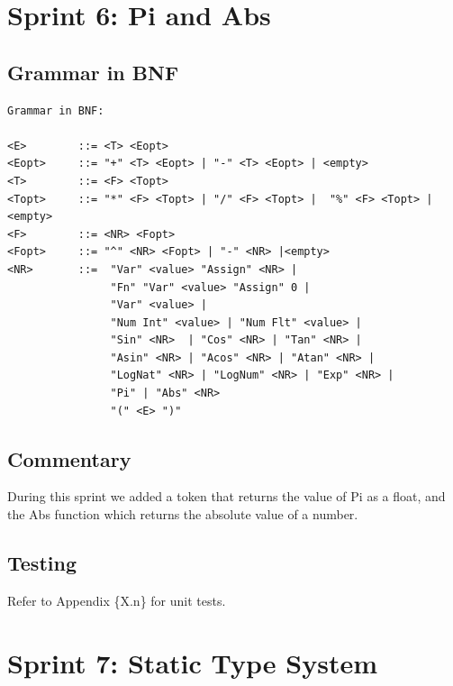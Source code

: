 \documentclass[a4paper, oneside, 11pt]{report}
\begin{document}
    \section{Sprint 6: Pi and Abs}
    \subsection{Grammar in BNF}
    \begin{verbatim}
Grammar in BNF:

<E>        ::= <T> <Eopt>
<Eopt>     ::= "+" <T> <Eopt> | "-" <T> <Eopt> | <empty>
<T>        ::= <F> <Topt>
<Topt>     ::= "*" <F> <Topt> | "/" <F> <Topt> |  "%" <F> <Topt> |<empty>
<F>        ::= <NR> <Fopt>
<Fopt>     ::= "^" <NR> <Fopt> | "-" <NR> |<empty>
<NR>       ::=  "Var" <value> "Assign" <NR> |
                "Fn" "Var" <value> "Assign" 0 |
                "Var" <value> |
                "Num Int" <value> | "Num Flt" <value> |
                "Sin" <NR>  | "Cos" <NR> | "Tan" <NR> |
                "Asin" <NR> | "Acos" <NR> | "Atan" <NR> |
                "LogNat" <NR> | "LogNum" <NR> | "Exp" <NR> |
                "Pi" | "Abs" <NR>
                "(" <E> ")"
    \end{verbatim}

    \subsection{Commentary}
    During this sprint we added a token that returns the value of Pi as a float, and the Abs function which returns the absolute value of a number.


    \subsection{Testing}
    Refer to Appendix \{X.n\} for unit tests.

    \clearpage
    \section{Sprint 7: Static Type System}
\end{document}
